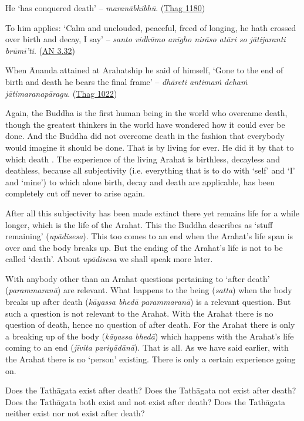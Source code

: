 He `has conquered death' -- \emph{maranābhibhū}. (\href{https://suttacentral.net/thag20.1/en/sujato}{Thag 1180})

To him applies: `Calm and unclouded, peaceful, freed of longing, he hath crossed over birth and decay, I say' -- \emph{santo vidhūmo anīgho nirāso atāri so jātijaranti brūmī'ti}. (\href{https://suttacentral.net/an3.32/en/bodhi}{AN 3.32})

When Ānanda attained at Arahatship he said of himself, `Gone to the end of birth and death he bears the final frame' -- \emph{dhāreti antimaṁ dehaṁ jātimaranapāragu}. (\href{https://suttacentral.net/thag17.3/en/sujato}{Thag 1022})

Again, the Buddha is the first human being in the world who overcame death, though the greatest thinkers in the world have wondered how it could ever be done. And the Buddha did not overcome death in the fashion that everybody would imagine it should be done. That is by living for ever. He did it by  that to which death . The experience of the living Arahat is birthless, decayless and deathless, because all subjectivity (i.e. everything that is to do with `self' and `I' and `mine') to which alone birth, decay and death are applicable, has been completely cut off never to arise again.

After all this subjectivity has been made extinct there yet remains life for a while longer, which is the life of the Arahat. This the Buddha describes as `stuff remaining' (\emph{upādisesa}). This too comes to an end when the Arahat's life span is over and the body breaks up. But the ending of the Arahat's life is not to be called `death'. About \emph{upādisesa} we shall speak more later.

With anybody other than an Arahat questions pertaining to `after death' (\emph{parammaranā}) are relevant. What happens to the being (\emph{satta}) when the body breaks up after death (\emph{kāyassa bhedā parammaranā}) is a relevant question. But such a question is not relevant to the Arahat. With the Arahat there is no question of death, hence no question of after death. For the Arahat there is only a breaking up of the body (\emph{kāyassa bhedā}) which happens with the Arahat's life coming to an end (\emph{jīvita pariyādānā}). That is all. As we have said earlier, with the Arahat there is no `person' existing. There is only a certain experience going on.

Does the Tathāgata exist after death? Does the Tathāgata not exist after death? Does the Tathāgata both exist and not exist after death? Does the Tathāgata neither exist nor not exist after death?

